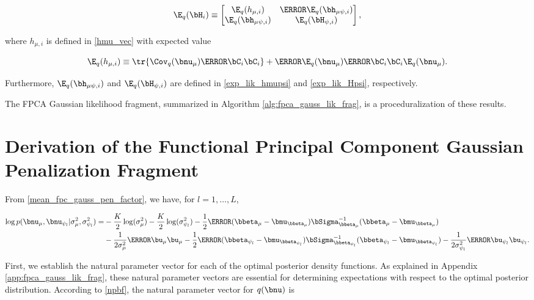 \documentclass[12pt]{article}
\def\sigsqmu{\sigma^2_{\mu}}
\def\betamu{\bbeta_\mu}
\def\umu{\bu_\mu}
\def\numu{\bnu_\mu}
\newcommand\betapsi[1]{\bbeta_{\psi_{#1}}}
\newcommand\upsi[1]{\bu_{\psi_{#1}}}
\newcommand\nupsi[1]{\bnu_{\psi_{#1}}}
\newcommand\sigsqpsi[1]{\sigma^2_{\psi_{#1}}}
\newcommand\hmu[1]{h_{\mu, i}}
\newcommand\hmupsi[1]{\bh_{\mu \psi, i}}
\newcommand\Hpsi[1]{\bH_{\psi, i}}
\theoremstyle{plain}
\theoremstyle{definition}
\theoremstyle{remark}
\begin{document}
\[
	\E_q (\bH_i) \equiv \begin{bmatrix}
		\E_q (\hmu{i}) & \T{\E_q (\hmupsi{i})} \\
		\E_q (\hmupsi{i}) & \E_q (\Hpsi{i})
	\end{bmatrix},
\]

\noindent where $\hmu{i}$ is defined in \eqref{hmu_vec} with expected value

\[
	\E_q (\hmu{i}) \equiv
		\tr \{ \Cov_q (\numu) \T{\bC_i} \bC_i \}
		+ \T{\E_q (\numu)} \T{\bC_i} \bC_i \E_q (\numu).
\]

\noindent Furthermore, $\E_q (\hmupsi{i})$ and $\E_q (\Hpsi{i})$ are defined in \eqref{exp_lik_hmupsi} and
\eqref{exp_lik_Hpsi}, respectively.

The FPCA Gaussian likelihood fragment, summarized in Algorithm \ref{alg:fpca_gauss_lik_frag}, is a
proceduralization of these results.


\section{Derivation of the Functional Principal Component Gaussian Penalization Fragment}
\label{app:mean_fpc_gauss_pen_frag}

From \eqref{mean_fpc_gauss_pen_factor}, we have, for $l = 1, \dots, L$,

\begin{align}
\begin{split}
	\log p (\numu, \nupsi{l} | \sigsqmu, \sigsqpsi{l}) =
		& -\frac{K}{2} \log (\sigsqmu) - \frac{K}{2} \log (\sigsqpsi{l})
			- \frac12 \T{(\betamu - \bmu_{\betamu})} \bSigma_{\betamu}^{-1} (\betamu - \bmu_{\betamu}) \\
		& - \frac{1}{2 \sigsqmu} \T{\umu} \umu
			- \frac12 \T{(\betapsi{l} - \bmu_{\betapsi{l}})} \bSigma_{\betapsi{l}}^{-1} (\betapsi{l} - \bmu_{\betapsi{l}})
			- \frac{1}{2 \sigsqpsi{l}} \T{\upsi{l}} \upsi{l}.
\end{split}
\label{log_mean_fpc_gauss_pen_factor}
\end{align}

First, we establish the natural parameter vector for each of the optimal posterior density functions. As explained
in Appendix \ref{app:fpca_gauss_lik_frag}, these natural
parameter vectors are essential for determining expectations with respect to the optimal posterior distribution.
According to \eqref{npbf}, the natural parameter vector for $q (\bnu)$ is
\end{document}
